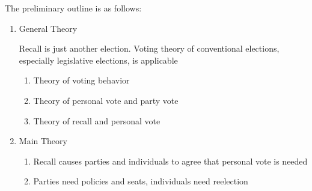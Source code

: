 \documentclass[hyphens, crop=false]{standalone}
\begin{document}
	The preliminary outline is as follows:
	
	\begin{enumerate}
		\item 
		General Theory
		
		Recall is just another election.
		Voting theory of conventional elections, especially legislative elections, is applicable
		\begin{enumerate}
			\item 
			Theory of voting behavior
			\item 
			Theory of personal vote and party vote
			\item 
			Theory of recall and personal vote
		\end{enumerate}
		\item 
		Main Theory
		\begin{enumerate}
			\item 
			Recall causes parties and individuals to agree that personal vote is needed
			\item 
			Parties need policies and seats, individuals need reelection

\end{enumerate}
\end{enumerate}
\end{document}
